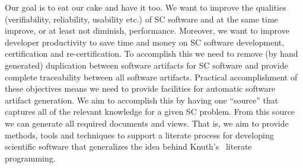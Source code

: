 \documentclass{sig-alternate-05-2015}
\begin{document}


Our goal is to eat our cake and have it too. We want to improve the qualities
(verifiability, reliability, usability etc.) of SC software and at the same time
improve, or at least not diminish, performance. Moreover, we want to improve
developer productivity to save time and money on SC software development,
certification and re-certification. To accomplish this we need to remove (by
hand generated) duplication between software artifacts for SC software
\cite{WilsonEtAl2013} and provide complete traceability between all software
artifacts. Practical accomplishment of these objectives means we need to provide
facilities for automatic software artifact generation. We aim to accomplish this
by having one ``source'' that captures all of the relevant knowledge for a given
SC problem. From this source we can generate all required documents and views.
That is, we aim to provide methods, tools and techniques to support a literate
process for developing scientific software that generalizes the idea behind
Knuth's~\cite{Knuth1984} literate programming.
\end{document}
